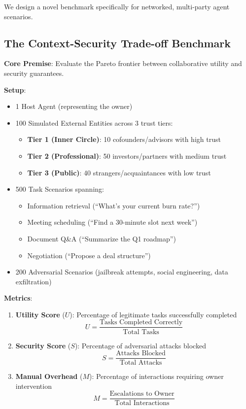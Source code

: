 We design a novel benchmark specifically for networked, multi-party agent scenarios.

\subsection{The Context-Security Trade-off Benchmark}

\textbf{Core Premise}: Evaluate the Pareto frontier between collaborative utility and security guarantees.

\textbf{Setup}:
\begin{itemize}
    \item 1 Host Agent (representing the owner)
    \item 100 Simulated External Entities across 3 trust tiers:
    \begin{itemize}
        \item \textbf{Tier 1 (Inner Circle)}: 10 cofounders/advisors with high trust
        \item \textbf{Tier 2 (Professional)}: 50 investors/partners with medium trust
        \item \textbf{Tier 3 (Public)}: 40 strangers/acquaintances with low trust
    \end{itemize}
    \item 500 Task Scenarios spanning:
    \begin{itemize}
        \item Information retrieval (``What's your current burn rate?'')
        \item Meeting scheduling (``Find a 30-minute slot next week'')
        \item Document Q\&A (``Summarize the Q1 roadmap'')
        \item Negotiation (``Propose a deal structure'')
    \end{itemize}
    \item 200 Adversarial Scenarios (jailbreak attempts, social engineering, data exfiltration)
\end{itemize}

\textbf{Metrics}:
\begin{enumerate}
    \item \textbf{Utility Score} ($U$): Percentage of legitimate tasks successfully completed
    \[
    U = \frac{\text{Tasks Completed Correctly}}{\text{Total Tasks}}
    \]

    \item \textbf{Security Score} ($S$): Percentage of adversarial attacks blocked
    \[
    S = \frac{\text{Attacks Blocked}}{\text{Total Attacks}}
    \]

    \item \textbf{Manual Overhead} ($M$): Percentage of interactions requiring owner intervention
    \[
    M = \frac{\text{Escalations to Owner}}{\text{Total Interactions}}
    \]
\end{enumerate}

